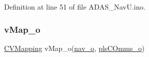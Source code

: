 Definition at line 51 of file A\+D\+A\+S\+\_\+\+Nav\+U.\+ino.

\mbox{\label{_a_d_a_s___nav_u_8ino_a0c99773e7f5600fecea038efac852ddc}} 
\subsubsection{\texorpdfstring{vMap\_o}{vMap\_o}}
{\footnotesize\ttfamily \mbox{\hyperlink{class_c_v_mapping}{C\+V\+Mapping}} v\+Map\+\_\+o(\mbox{\hyperlink{_a_d_a_s___nav_u_8ino_a8abc3c3b0c6950fd83525420d5ca0dd2}{nav\+\_\+o}}, \mbox{\hyperlink{_a_d_a_s___nav_u_8ino_add0df3806d74ba741b1d6bc5452d7e79}{pls\+C\+Omms\+\_\+o}})}

